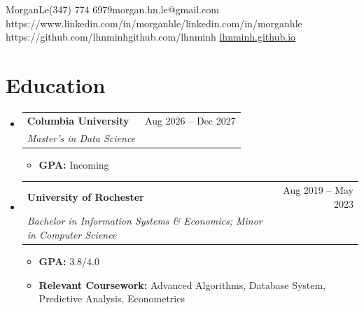 \documentclass[a4paper,10pt]{article}
\makeatletter
\newcommand{\resumeItem}[1]{
  \item\small{{#1 \vspace{-2pt}}}
}
\newcommand{\resumeSubheading}[4]{
  \vspace{-2pt}\item
    \begin{tabular*}{0.97\textwidth}[t]{l@{\extracolsep{\fill}}r}
      \small\textbf{#1} & \small #2 \\
      \textit{\small #3} & \textit{\small #4} \\
    \end{tabular*}\vspace{-7pt}
}
\newcommand{\resumeSubHeadingListStart}{\begin{itemize}[leftmargin=0.15in,label={}]}
\newcommand{\resumeSubHeadingListEnd}{\end{itemize}}
\newcommand{\resumeItemListStart}{\begin{itemize}[leftmargin=0.22in]}
\newcommand{\resumeItemListEnd}{\end{itemize}\vspace{-5pt}}
\makeatother
\begin{document}
\resumeContactHeader
  {Morgan}{Le}{(347) 774 6979}{morgan.hn.le@gmail.com}
  {https://www.linkedin.com/in/morganhle/}{linkedin.com/in/morganhle}
  {https://github.com/lhnminh}{github.com/lhnminh}
  {\href{https://lhnminh.github.io/}{lhnminh.github.io}}

\section{Education}
\resumeSubHeadingListStart
  \resumeSubheading
    {Columbia University}{Aug 2026 -- Dec 2027}
    {Master's in Data Science}{}
    \resumeItemListStart
      \resumeItem{{\bfseries GPA:} Incoming}
    \resumeItemListEnd
  \resumeSubheading
    {University of Rochester}{Aug 2019 -- May 2023}
    {Bachelor in Information Systems \& Economics; Minor in Computer Science}{}
    \resumeItemListStart
      \resumeItem{{\bfseries GPA:} 3.8/4.0}
      \resumeItem{{\bfseries Relevant Coursework:} Advanced Algorithms, Database System, Predictive Analysis, Econometrics}
    \resumeItemListEnd
\resumeSubHeadingListEnd
\end{document}
